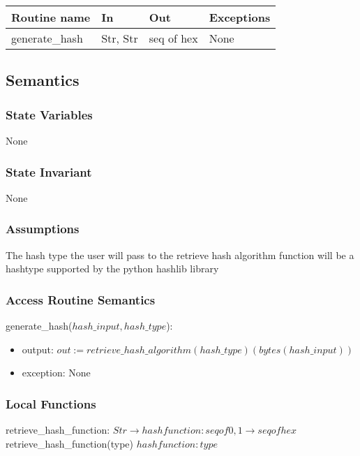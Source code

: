 \documentclass[12pt, titlepage]{article}
\begin{document}
\begin{tabular}{| l | l | l | l |}
\hline
\textbf{Routine name} & \textbf{In} & \textbf{Out} & \textbf{Exceptions}\\
\hline
generate\_hash & Str, Str & seq of hex &  None\\
\hline
\end{tabular}

\subsection* {Semantics}

\subsubsection* {State Variables}

None

\subsubsection* {State Invariant}

None

\subsubsection* {Assumptions}

The hash type the user will pass to the retrieve hash algorithm function will be a hashtype supported by the python hashlib library

\subsubsection* {Access Routine Semantics}

generate\_hash($hash\_input, hash\_type$):
\begin{itemize}
\item output: $out := retrieve\_hash\_algorithm(hash\_type)(bytes(hash\_input))$
\item exception: None
\end{itemize}

\subsubsection*{Local Functions}
retrieve\_hash\_function: $Str \rightarrow hashfunction : seq of {0,1} \rightarrow seq of hex$ \\
retrieve\_hash\_function(type) $hashfunction : type$\\
\end{document}
